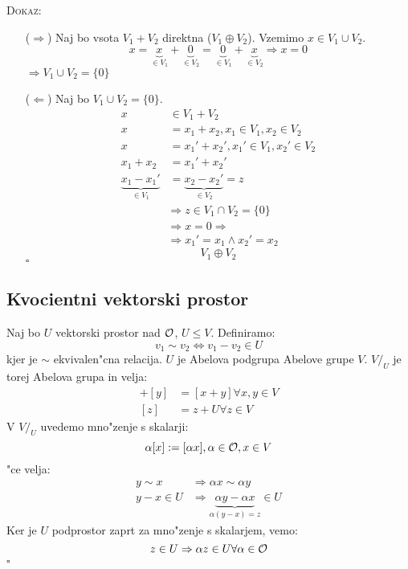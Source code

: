 \textsc{Dokaz:}
\begin{itemize}
	\item[($\Rightarrow$)] Naj bo vsota $V_1 + V_2$ direktna ($V_1 \oplus V_2$). Vzemimo $x \in V_1 \cup V_2$.
	\begin{equation*}
	x = \underbrace{x}_{\in V_1} + \underbrace{0}_{\in V_2} = \underbrace{0}_{\in V_1} + \underbrace{x}_{\in V_2} \Rightarrow x = 0
	\end{equation*}
	$\Rightarrow V_1 \cup V_2 = \{0\}$
	
	\item[($\Leftarrow$)] Naj bo $V_1 \cup V_2 = \{0\}$.
	\begin{align*}
	x &\in V_1 + V_2 \\
	x &= x_1 + x_2, x_1 \in V_1, x_2 \in V_2 \\
	x &= x_1' + x_2', x_1' \in V_1, x_2' \in V_2 \\
	x_1 + x_2 &= x_1' + x_2' \\
	\underbrace{x_1 - x_1'}_{\in V_1} &= \underbrace{x_2 - x_2'}_{\in V_2} = z
	\end{align*}
	\begin{align*}
	&\Rightarrow z \in V_1 \cap V_2 = \{0\} \\
	&\Rightarrow x = 0 \Rightarrow \\
	&\Rightarrow x_1' = x_1 \land x_2' = x_2
	\end{align*}
	\begin{equation*}
	V_1 \oplus V_2
	\end{equation*}
	\hfill $\square$
\end{itemize}

\subsection{Kvocientni vektorski prostor}
Naj bo $U$ vektorski prostor nad $\mathcal{O}$, $U \leq V$. Definiramo:
\begin{equation*}
v_1 \sim v_2 \iff v_1 - v_2 \in U
\end{equation*}
kjer je $\sim$ ekvivalen"cna relacija. $U$ je Abelova podgrupa Abelove grupe $V$. $V/_U$ je torej Abelova grupa in velja:
\begin{align*}
[x] + [y] &= [x+y] \forall x, y \in V \\
[z] &= z + U \forall z \in V
\end{align*}
V $V/_U$ uvedemo mno"zenje s skalarji:
\begin{equation*}
\alpha [x] := [\alpha x], \alpha \in \mathcal{O}, x \in V
\end{equation*}
 "ce velja:
\begin{align*}
y \sim x &\Rightarrow \alpha x \sim \alpha y \\
y -x \in U &\Rightarrow \underbrace{\alpha y - \alpha x}_{\alpha (y - x) = z} \in U
\end{align*}
Ker je $U$ podprostor zaprt za mno"zenje s skalarjem, vemo:
\begin{equation*}
z \in U \Rightarrow \alpha z \in U \forall \alpha \in \mathcal{O}
\end{equation*}
\hfill $\square$

